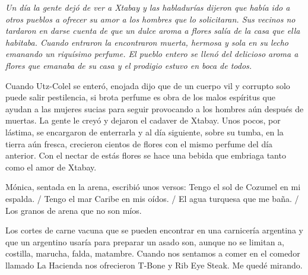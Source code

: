\documentclass[11pt,twoside,openright,a6paper]{book}
\begin{document}
\vspace{0.5cm}
\hrulefill\hspace{0.2cm} \decofourleft\decofourright \hspace{0.2cm} \hrulefill
\vspace{0.5cm}

{\em Un día la gente dejó de ver a Xtabay y las habladurías dijeron
que había ido a otros pueblos a ofrecer su amor a los hombres que lo
solicitaran. Sus vecinos no tardaron en darse cuenta de que un dulce aroma
a flores salía de la casa que ella habitaba. Cuando entraron la encontraron
muerta, hermosa y sola en su lecho emanando un riquísimo perfume. El pueblo
entero se llenó del delicioso aroma a flores que emanaba de su casa y el
prodigio estuvo en boca de todos.

Cuando Utz-Colel se enteró, enojada dijo que de un cuerpo vil y corrupto solo
puede salir pestilencia, si brota perfume es obra de los malos espíritus
que ayudan a las mujeres sucias para seguir provocando a los hombres aún
después de muertas. La gente le creyó y dejaron el cadaver de Xtabay. Unos
pocos, por lástima, se encargaron de enterrarla y al día siguiente,
sobre su tumba, en la tierra aún fresca, crecieron cientos de flores con
el mismo perfume del día anterior. Con el nectar de estás flores se hace
una bebida que embriaga tanto como el amor de Xtabay.}


\vspace{0.5cm}
\hrulefill\hspace{0.2cm} \decofourleft\decofourright \hspace{0.2cm} \hrulefill
\vspace{0.5cm}

Mónica, sentada en la arena, escribió unos versos: Tengo el sol de Cozumel
en mi espalda. / Tengo el mar Caribe en mis oídos. / El agua turquesa que
me baña. / Los granos de arena que no son míos.


\vspace{0.5cm}
\hrulefill\hspace{0.2cm} \decofourleft\decofourright \hspace{0.2cm} \hrulefill
\vspace{0.5cm}

Los cortes de carne vacuna que se pueden encontrar en una carnicería
argentina y que un argentino usaría para preparar un asado son, aunque
no se limitan a, costilla, marucha, falda, matambre. Cuando nos sentamos
a comer en el comedor llamado La Hacienda nos ofrecieron T-Bone y Rib Eye
Steak. Me quedé mirando.
\end{document}
